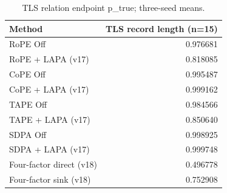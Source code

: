 \begin{table}[t]
\centering
\scriptsize
\caption{TLS relation endpoint p\_true; three-seed means.}
\begin{tabular}{lr}
\toprule
Method & TLS record length (n=15) \\
\midrule
RoPE Off & 0.976681 \\
RoPE + LAPA (v17) & 0.818085 \\
CoPE Off & 0.995487 \\
CoPE + LAPA (v17) & 0.999162 \\
TAPE Off & 0.984566 \\
TAPE + LAPA (v17) & 0.850640 \\
SDPA Off & 0.998925 \\
SDPA + LAPA (v17) & 0.999748 \\
Four-factor direct (v18) & 0.496778 \\
Four-factor sink (v18) & 0.752908 \\
\bottomrule
\end{tabular}
\end{table}
